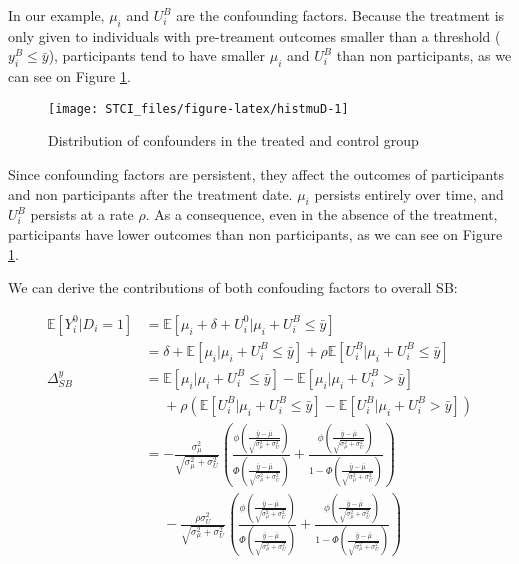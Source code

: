 \documentclass[]{book}
\newcommand{\esp}[1]{\mathbb{E}[ #1 ]}
\theoremstyle{definition}
\theoremstyle{definition}
\theoremstyle{definition}
\theoremstyle{remark}
\let\BeginKnitrBlock\begin \let\EndKnitrBlock\end
\begin{document}
\BeginKnitrBlock{example}
\protect\hypertarget{exm:unnamed-chunk-19}{}{\label{exm:unnamed-chunk-19}
}In our example, \(\mu_i\) and \(U_i^B\) are the confounding factors.
Because the treatment is only given to individuals with pre-treament
outcomes smaller than a threshold (\(y_i^B\leq\bar{y}\)), participants
tend to have smaller \(\mu_i\) and \(U_i^B\) than non participants, as
we can see on Figure \ref{fig:histmuD}.
\EndKnitrBlock{example}

\begin{figure}[htbp]

{\centering \texttt{[image: STCI\_files/figure-latex/histmuD-1]} 

}

\caption{Distribution of confounders in the treated and control group}\label{fig:histmuD}
\end{figure}

Since confounding factors are persistent, they affect the outcomes of
participants and non participants after the treatment date. \(\mu_i\)
persists entirely over time, and \(U_i^B\) persists at a rate \(\rho\).
As a consequence, even in the absence of the treatment, participants
have lower outcomes than non participants, as we can see on Figure
\ref{fig:histmuD}.

We can derive the contributions of both confouding factors to overall
SB:

\begin{align*}
\esp{Y_i^0|D_i=1} & = \esp{\mu_i+\delta+U_i^0|\mu_i+U_i^B\leq\bar{y}}\\
                  & = \delta + \esp{\mu_i|\mu_i+U_i^B\leq\bar{y}} + \rho\esp{U_i^B|\mu_i+U_i^B\leq\bar{y}}\\
\Delta^y_{SB}     & = \esp{\mu_i|\mu_i+U_i^B\leq\bar{y}}-\esp{\mu_i|\mu_i+U_i^B>\bar{y}} \\
                  & \phantom{=} + \rho\left(\esp{U_i^B|\mu_i+U_i^B\leq\bar{y}}-\esp{U_i^B|\mu_i+U_i^B>\bar{y}}\right)\\
                  & = -\frac{\sigma^2_{\mu}}{\sqrt{\sigma^2_{\mu}+\sigma^2_{U}}}\left(\frac{\phi\left(\frac{\bar{y}-\bar{\mu}}{\sqrt{\sigma^2_{\mu}+\sigma^2_{U}}}\right)}{\Phi\left(\frac{\bar{y}-\bar{\mu}}{\sqrt{\sigma^2_{\mu}+\sigma^2_{U}}}\right)}+\frac{\phi\left(\frac{\bar{y}-\bar{\mu}}{\sqrt{\sigma^2_{\mu}+\sigma^2_{U}}}\right)}{1-\Phi\left(\frac{\bar{y}-\bar{\mu}}{\sqrt{\sigma^2_{\mu}+\sigma^2_{U}}}\right)}\right) \\
                  & \phantom{=} -\frac{\rho\sigma^2_{U}}{\sqrt{\sigma^2_{\mu}+\sigma^2_{U}}}\left(\frac{\phi\left(\frac{\bar{y}-\bar{\mu}}{\sqrt{\sigma^2_{\mu}+\sigma^2_{U}}}\right)}{\Phi\left(\frac{\bar{y}-\bar{\mu}}{\sqrt{\sigma^2_{\mu}+\sigma^2_{U}}}\right)}+\frac{\phi\left(\frac{\bar{y}-\bar{\mu}}{\sqrt{\sigma^2_{\mu}+\sigma^2_{U}}}\right)}{1-\Phi\left(\frac{\bar{y}-\bar{\mu}}{\sqrt{\sigma^2_{\mu}+\sigma^2_{U}}}\right)}\right)
\end{align*}
\end{document}
